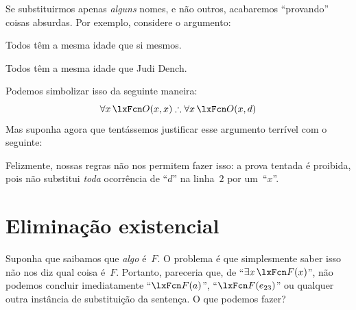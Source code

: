 Se substituirmos apenas \emph{alguns} nomes, e não outros, acabaremos
\textquotedblleft provando\textquotedblright{} coisas absurdas. Por exemplo, considere o argumento:
	\begin{earg}
\item Todos têm a mesma idade que si mesmos.
\item[\texttherefore] Todos têm a mesma idade que Judi Dench.
	\end{earg}
Podemos simbolizar isso da seguinte maneira:
$$\forall x\,\atom{O}{x,x} \therefore \forall x\,\atom{O}{x,d}$$
Mas suponha agora que tentássemos justificar esse argumento terrível com o seguinte:
\begin{fitchproof}
	\PR
\end{fitchproof}
Felizmente, nossas regras não nos permitem fazer isso: a prova
tentada é proibida, pois não substitui \emph{toda} ocorrência de \textquotedblleft $d$\textquotedblright{}
na linha~$2$ por um~\textquotedblleft $x$\textquotedblright{}.

\section{Eliminação existencial}\label{s:existsElim}

Suponha que saibamos que \emph{algo} é~$F$. O problema é que simplesmente saber isso não nos diz qual coisa é~$F$. Portanto, pareceria que, de \textquotedblleft $\exists x\,\atom{F}{x}$\textquotedblright{}, não podemos concluir imediatamente \textquotedblleft $\atom{F}{a}$\textquotedblright{}, \textquotedblleft $\atom{F}{e_{23}}$\textquotedblright{} ou qualquer outra instância de substituição da sentença. O que podemos fazer?

